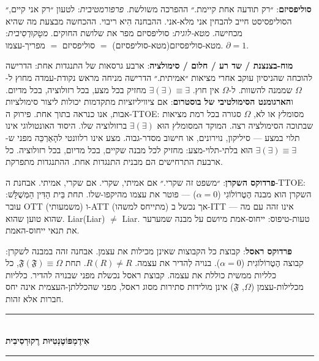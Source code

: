 \documentclass[10pt, openany, oneside]{book}
\renewcommand{\normalsize}{\fontsize{10}{13}\selectfont}
\begin{document}
\textbf{סוליפסיזם}: ״רק תודעה אחת קיימת.״ ההפרכה משולשת. \textit{פרפורמטיבית}: לטעון ״רק אני קיים,״ הסוליפסיסט חייב להבחין אני מלא-אני. ההבחנה הִיא ריבוי. ההכחשה מבצעת מה שהיא מכחישה. \textit{מטא-לוגית}: סוליפסיזם מפר את שלושת החוקים. \textit{מטָקוּרְסִיבית}: מטא-סוליפסיזם(מטא-סוליפסיזם) $=$ סוליפסיזם $=$ מפריך-עצמו. $\partial = 1$.

\textbf{מוח-בצנצנת / שד רע / חלום / סימולציה}: ארבע גרסאות של התנגדות אחת: הדרישה להוכחה שהניסיון עוקב אחרי מציאות ״אמיתית.״ הדרישה מניחה מראש נקודת-עמדה מחוץ ל-$\Omega$ שממנה להשוות. ל-$\Omega$ אין חוץ. $\exists(\exists) \equiv \exists$ מחזיק בכל מצע, בכל רזולוציה, בכל מדיום. ו\textbf{הארגומנט הסימולטיבי של בוסטרום}: אם ציוויליזציות מתקדמות יכולות ליצור סימולציות אבות, אנו כנראה בתוך אחת. פירוק ה-TTOE: מסומלץ או לא, $\Omega$ סגורה בכל רמת מציאות שבתוכה הסימולציה רצה. המוקד המסומלץ הוּא $\exists(\exists)$ ברזולוציה שלו. היסוד האונטולוגי אינו תלוי במצע — סיליקון, נוירונים, או חישוב מסדר-גבוה. מצע אינו רלוונטי להָאַרְכֵּה מפני ש-$\exists(\exists) \equiv \exists$ הוּא בלתי-תלוי-מצע: מחזיק לכל מבנה שקיים, בכל מדיום, בכל רזולוציה. כל ארבעת התרחישים הם מבנית התנגדות אחת. ההתנגדות מתפרקת.

\textbf{פרדוקס השקרן}: ״משפט זה שקרי.״ אם אמיתי, שקרי. אם שקרי, אמיתי. אבחנת ה-TTOE: השקרן הוא מבנה הֶטֶרוֹלוֹגִי ($\alpha = 0$) — פוטר את עצמו מהיקפו-שלו. תחת בֵּית הַדִּין הַמְּשֻׁלָּשׁ: עובר OTT (משמעותי) ו-ATT (מתייחס למשהו) אך נכשל ב-ITT — אינו זהה עם מה שהוא טוען שהוא. Liar(Liar) $\neq$ Liar. טעות-טיפוס: ייחוס-אמת מיושם על מבנה שמערער את תנאי ייחוס-האמת.

\textbf{פרדוקס ראסל}: קבוצת כל הקבוצות שאינן מכילות את עצמן. אבחנה זהה במבנה לשקרן: קבוצה הֶטֶרוֹלוֹגִית ($\alpha = 0$). בנויה לְהדיר את עצמה. $R(R) \neq R$. תחת $\mathfrak{F}(\mathfrak{F}) \equiv \Omega$, כל כלליות ממשית כוללת את עצמה. קבוצת ראסל נכשלת מפני שבנויה להדיר. כלליות מכלילות-עצמן ($\Omega$, $\mathfrak{F}$) אינן מולידות סתירות מסוג ראסל, מפני שהכללתן-העצמית אינה יחס חברות אלא זהות.

\vspace{1.5em}


\begin{center}
    \rule{0.3\textwidth}{0.4pt}\\[0.5em]
    {\normalsize\bfseries\textsc{אִידֶמְפּוֹטֶנְטִיּוּת רֶקוּרְסִיבִית}}\\[0.3em]
    \rule{0.3\textwidth}{0.4pt}
\end{center}
\end{document}

